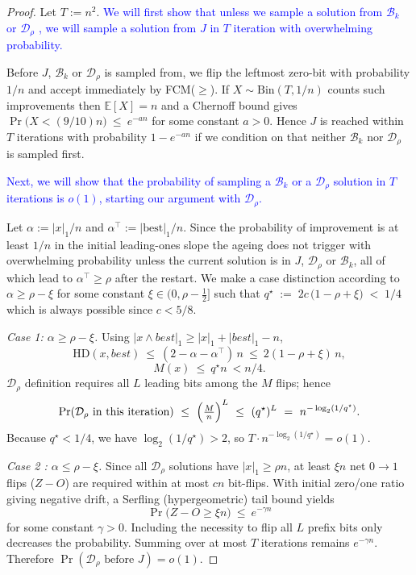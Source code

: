 \begin{proof}
	Let $T:=n^2$. \textcolor{blue}{We will first show that unless we sample a solution from $\mathcal{B}_k$ or $\mathcal{D}_\rho$ , we will sample a solution from $J$ in $T$ iteration with overwhelming probability.}
	
	Before $J$, $\mathcal{B}_k$ or $\mathcal{D}_\rho$ is sampled from, we flip the leftmost zero-bit with probability $1/n$ and accept
	immediately by FCM($\ge$).  If $X\sim\mathrm{Bin}(T,1/n)$ counts such improvements then
	$\mathbb{E}[X]=n$ and a Chernoff bound gives
	$
	\Pr\bigl(X<(9/10)n\bigr)\ \le\ e^{-a n}
	$
	for some constant $a>0$. Hence $J$ is reached within $T$ iterations with probability $1-e^{-a n}$ if we condition on that neither $\mathcal{B}_k$ nor $\mathcal{D}_\rho$ is sampled first.
	
	\textcolor{blue}{
		Next, we will show that the probability of sampling a $\mathcal{B}_k$ or a $\mathcal{D}_\rho$ solution in $T$ iterations is $o(1)$, starting our argument with $\mathcal{D}_\rho$. 
		}
	
	Let $\alpha:=|x|_1/n$ and $\alpha^\top:=|\text{best}|_1/n$. Since the probability of improvement is at least $1/n$ in the initial leading-ones slope the ageing does not trigger with overwhelming probability unless the current solution is in $J$, $\mathcal{D}_\rho$ or $\mathcal{B}_k$, all of which lead to $\alpha^\top\ge\rho$ after the restart. We make a case distinction according to $\alpha\ge \rho-\xi$ for some constant $\xi\in(0,\rho-\tfrac12]$  such that	$q^\star \;:=\; 2c\,\bigl(1-\rho+\xi\bigr) \;<\; 1/4$ which is always possible since $c<5/8$. 
	
	\emph{Case 1: $\alpha\ge \rho-\xi$.}
	Using $|x\wedge best|_1\ge |x|_1+|best|_1-n$,
	\[
	\mathrm{HD}(x,best)\ \le\ (2-\alpha-\alpha^\top)\,n\ \le\ 2(1-\rho+\xi)\,n,
	\]
	\[
	M(x)\ \le\ q^\star n\ <n/4
	.
	\]
	$\mathcal{D}_\rho$ definition requires all $L$ leading bits among the $M$ flips; hence
	\[
	\Pr(\text{$\mathcal{D}_\rho$ in this iteration})
	\ \le\
	\Bigl(\tfrac{M}{n}\Bigr)^{L}
	\ \le\
	(q^\star)^{L}
	\ =\
	n^{-\log_{2}(1/q^\star)}.
	\]
	Because $q^\star<1/4$, we have $\log_{2}(1/q^\star)>2$, so $T\cdot n^{-\log_{2}(1/q^\star)}=o(1)$.
	
	\emph{Case 2 : $\alpha\le \rho-\xi$.}
	Since all $\mathcal{D}_\rho$ solutions have $|x|_1\ge \rho n$, at least $\xi n$ net $0\!\to\!1$ flips ($Z-O$) are required within at most
	$cn$ bit-flips. With initial zero/one ratio giving negative drift,
	a Serfling (hypergeometric) tail bound yields
	\[
	\Pr\bigl(Z-O\ge \xi n\bigr)\ \le\ e^{-\gamma n}
	\]
	for some constant $\gamma>0$. Including the necessity to flip all $L$ prefix bits only decreases the probability.
	Summing over at most $T$ iterations remains $e^{-\gamma n}$. Therefore $\Pr(\text{$\mathcal{D}_\rho$ before }J)=o(1)$.
	

\end{proof}
